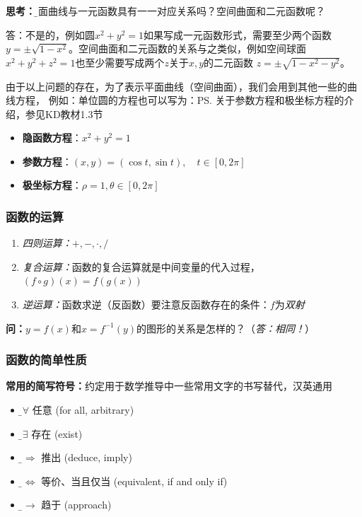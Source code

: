	{\bf 思考：}{\b 平面曲线与一元函数具有一一对应关系吗？}空间曲面和二元函数呢？
	
	答：不是的，例如圆$x^2+y^2=1$如果写成一元函数形式，需要至少两个函数
	$y=\pm\sqrt{1-x^2}$。空间曲面和二元函数的关系与之类似，例如空间球面
	$x^2+y^2+z^2=1$也至少需要写成两个$z$关于$x,y$的二元函数
	$z=\pm\sqrt{1-x^2-y^2}$。
	
	由于以上问题的存在，为了表示平面曲线（空间曲面），我们会用到其他一些的曲线方程，
	例如：单位圆的方程也可以写为：\ps{关于参数方程和极坐标方程的介绍，参见KD教材1.3节}
	\begin{itemize}
		\item {\bf 隐函数方程}：$x^2+y^2=1$
		\item {\bf 参数方程}：$(x,y)=(\cos t,\sin t),\quad t\in[0,2\pi]$
		\item {\bf 极坐标方程}：$\rho=1,\theta\in[0,2\pi]$
	\end{itemize}
	
\subsubsection{函数的运算}

\begin{enumerate}
  \setlength{\itemindent}{1cm}
  \item {\it 四则运算：}$+,-,\cdot,/$
  \item {\it 复合运算：}函数的复合运算就是中间变量的代入过程，$(f\circ g)(x)=f(g(x))$
  \item {\it 逆运算：}函数求逆（反函数）要注意反函数存在的条件：$f$为{\it 双射}
\end{enumerate}

{\bf 问：}$y=f(x)$和$x=f^{-1}(y)$的图形的关系是怎样的？（{\it 答：相同！}）

\subsubsection{函数的简单性质}
	
\begin{tcolorbox}[colback=white!90!black]
	{\bf 常用的简写符号：}约定用于数学推导中一些常用文字的书写替代，汉英通用
	\begin{itemize}
	  \item {\b$\bm{\forall}$} \quad 任意 (for all, arbitrary)
	  \item {\b$\bm{\exists}$} \quad 存在 (exist)
	  \item {\b$\bm{\Rightarrow}$} \quad 推出 (deduce, imply)
	  \item {\b$\bm{\Leftrightarrow}$} \quad 等价、当且仅当 (equivalent, if and only if)
	  \item {\b$\bm{\to}$} \quad 趋于 (approach)
	\end{itemize}
\end{tcolorbox}

